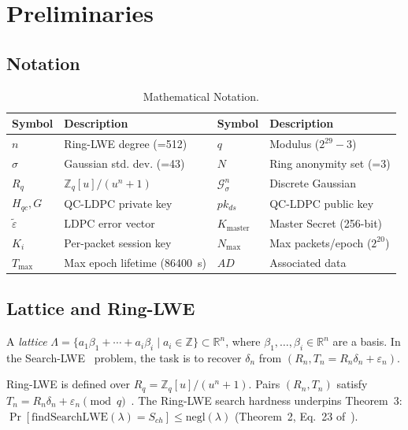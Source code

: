 \documentclass[runningheads]{llncs}
\newcommand{\Kmaster}{K_{\mathrm{master}}}
\newcommand{\Nmax}{N_{\max}}
\newcommand{\Tmax}{T_{\max}}
\begin{document}
\section{Preliminaries}
\label{sec:prelim}

\subsection{Notation}

\begin{table}[t]
\caption{Mathematical Notation.}
\label{tab:notation}
\centering
\begin{tabular}{|l|l|l|l|}
\hline
\textbf{Symbol} & \textbf{Description} & \textbf{Symbol} & \textbf{Description} \\
\hline
$n$ & Ring-LWE degree (=512) & $q$ & Modulus ($2^{29}-3$) \\
$\sigma$ & Gaussian std. dev. (=43) & $N$ & Ring anonymity set (=3) \\
$R_q$ & $\mathbb{Z}_q[u]/(u^n+1)$ & $\mathcal{G}^n_\sigma$ & Discrete Gaussian \\
$H_{qc}, G$ & QC-LDPC private key & $pk_{ds}$ & QC-LDPC public key \\
$\tilde{\varepsilon}$ & LDPC error vector & $\Kmaster$ & Master Secret (256-bit) \\
$K_i$ & Per-packet session key & $\Nmax$ & Max packets/epoch ($2^{20}$) \\
$\Tmax$ & Max epoch lifetime (86400~s) & $AD$ & Associated data \\
\hline
\end{tabular}
\end{table}

\subsection{Lattice and Ring-LWE}

A \emph{lattice} $\Lambda = \{ a_1\beta_1 + \cdots + a_i\beta_i \mid a_i \in \mathbb{Z} \} \subset \mathbb{R}^n$,
where $\beta_1,\ldots,\beta_i \in \mathbb{R}^n$ are a basis. In the
Search-LWE~\cite{regev2009} problem, the task is to recover $\delta_n$ from
$(R_n, T_n = R_n\delta_n + \varepsilon_n)$.

Ring-LWE is defined over $R_q = \mathbb{Z}_q[u]/(u^n+1)$. Pairs $(R_n, T_n)$
satisfy $T_n = R_n\delta_n + \varepsilon_n \pmod{q}$~\cite{lyubashevsky2013,regev2009}.
The Ring-LWE search hardness underpins Theorem~3:
$\Pr[\mathrm{findSearchLWE}(\lambda) = S_{ch}] \leq \mathrm{negl}(\lambda)$
(Theorem~2, Eq.~23 of~\cite{kumari2022}).
\end{document}
